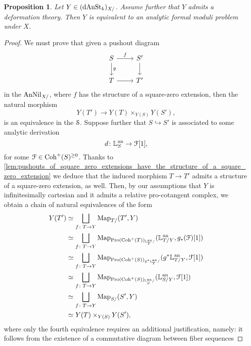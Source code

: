 \documentclass[10pt,a4paper,reqno]{amsart} %
\theoremstyle{plain}
\newtheorem{prop}[thm]{Proposition}
\theoremstyle{definition}
\theoremstyle{remark}
\numberwithin{equation}{section}
\begin{document}
\begin{prop} \label{prop:sufficient_conditions_for_a_prestack_to_be_equiv_to_an_analytic_FMP}
    Let $Y \in (\mathrm{dAnSt}_k)_{X/}$. Assume further that $Y$ admits a deformation theory.
    Then $Y$ is equivalent to an analytic formal moduli problem under $X$.
\end{prop}

\begin{proof}
    We must prove that given a pushout diagram
        \[
        \begin{tikzcd}
            S \ar{r}{f} \ar{d}{g} & S' \ar{d} \\
            T \ar{r} & T'  
        \end{tikzcd}
        \]
    in the \infcat $\mathrm{AnNil}_{X/}$, where $f$ has the structure of a square-zero extension, then the natural morphism
        \[
            Y(T') \to Y(T) \times_{Y(S)} Y(S'),  
        \]
    is an equivalence in the \infcat $\mathcal S$. Suppose further that $S \hookrightarrow S'$ is associated to some analytic derivation
        \[
            d \colon \mathbb L^\mathrm{an}_S \to \mathcal F[1],
        \]
    for some $\mathcal F \in \mathrm{Coh}^+(S)^{\ge 0}$.
    Thanks to \cref{lem:pushouts_of_square_zero_extensions_have_the_structure_of_a_square_zero_extension} we deduce
    that the induced morphism $T \to T'$ admits a structure of a square-zero extension, as well.
    Then, by our assumptions that $Y$ is infinitesimally cartesian and it admits a relative pro-cotangent complex, we obtain a chain of natural equivalences of the form
        \begin{align*}
            Y(T') & \simeq \bigsqcup_{f \colon T \to Y} \operatorname{Map}_{T/ }(T', Y) \\
                  & \simeq \bigsqcup_{f \colon T \to Y} \operatorname{Map}_{\mathrm{Pro}(\mathrm{Coh}^+(T))_{\mathbb L^\mathrm{an}_T/ }}(\mathbb L^\mathrm{an}_{T/ Y}, g_*(\mathcal F)[1]) \\
                  & \simeq \bigsqcup_{f \colon T \to Y} \operatorname{Map}_{\mathrm{Pro}(\mathrm{Coh}^+(S))_{g^* \mathbb L^\mathrm{an}_T/ }}(g^* \mathbb L^\mathrm{an}_{T/ Y}, \mathcal F[1]) \\
                  & \simeq \bigsqcup_{f \colon T \to Y} \operatorname{Map}_{\mathrm{Pro}(\mathrm{Coh}^+(S))_{\mathbb L^\mathrm{an}_S/ }}(\mathbb L^\mathrm{an}_{S/ Y}, \mathcal F[1]) \\
                  & \simeq \bigsqcup_{f \colon T \to Y} \operatorname{Map}_{S/ }(S', Y) \\
                  & \simeq Y(T) \times_{Y(S)} Y(S'),
        \end{align*}
    where only the fourth equivalence requires an additional justification, namely: it follows from the existence of a commutative diagram between fiber sequences

\end{proof}
\end{document}
